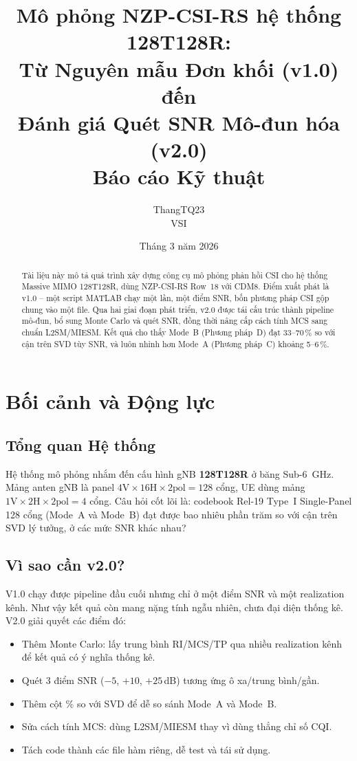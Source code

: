 \documentclass[11pt,a4paper]{article}
\title{
    \vspace{-1.5cm}
    \Large\textbf{Mô phỏng NZP-CSI-RS hệ thống 128T128R:}\\[4pt]
    \large Từ Nguyên mẫu Đơn khối (v1.0) đến\\
    Đánh giá Quét SNR Mô-đun hóa (v2.0)\\[8pt]
    \normalsize Báo cáo Kỹ thuật
}
\author{ThangTQ23 \\ VSI}
\date{Tháng 3 năm 2026}
\begin{document}
\maketitle
\thispagestyle{fancy}

\begin{abstract}
Tài liệu này mô tả quá trình xây dựng công cụ mô phỏng phản hồi CSI cho hệ thống
Massive MIMO 128T128R, dùng NZP-CSI-RS Row~18 với CDM8. Điểm xuất phát là v1.0
-- một script MATLAB chạy một lần, một điểm SNR, bốn phương pháp CSI gộp chung
vào một file. Qua hai giai đoạn phát triển, v2.0 được tái cấu trúc thành pipeline
mô-đun, bổ sung Monte Carlo và quét SNR, đồng thời nâng cấp cách tính MCS sang
chuẩn L2SM/MIESM. Kết quả cho thấy Mode~B (Phương pháp~D) đạt 33--70\,\% so với
cận trên SVD tùy SNR, và luôn nhỉnh hơn Mode~A (Phương pháp~C) khoảng 5--6\,\%.
\end{abstract}

\tableofcontents
\newpage

\section{Bối cảnh và Động lực}

\subsection{Tổng quan Hệ thống}

Hệ thống mô phỏng nhắm đến cấu hình gNB \textbf{128T128R} ở băng Sub-6~GHz.
Mảng anten gNB là panel $4\text{V}\times16\text{H}\times2\text{pol} = 128$ cổng,
UE dùng mảng $1\text{V}\times2\text{H}\times2\text{pol} = 4$ cổng.
Câu hỏi cốt lõi là: codebook Rel-19 Type~I Single-Panel 128 cổng (Mode~A và Mode~B)
đạt được bao nhiêu phần trăm so với cận trên SVD lý tưởng, ở các mức SNR khác nhau?

\subsection{Vì sao cần v2.0?}

V1.0 chạy được pipeline đầu cuối nhưng chỉ ở một điểm SNR và một realization kênh.
Như vậy kết quả còn mang nặng tính ngẫu nhiên, chưa đại diện thống kê. V2.0 giải
quyết các điểm đó:

\begin{itemize}[noitemsep]
    \item Thêm Monte Carlo: lấy trung bình RI/MCS/TP qua nhiều realization kênh
          để kết quả có ý nghĩa thống kê.
    \item Quét 3 điểm SNR ($-5$, $+10$, $+25$\,dB) tương ứng ô xa/trung bình/gần.
    \item Thêm cột \% so với SVD để dễ so sánh Mode~A và Mode~B.
    \item Sửa cách tính MCS: dùng L2SM/MIESM thay vì dùng thẳng chỉ số CQI.
    \item Tách code thành các file hàm riêng, dễ test và tái sử dụng.
\end{itemize}
\end{document}
